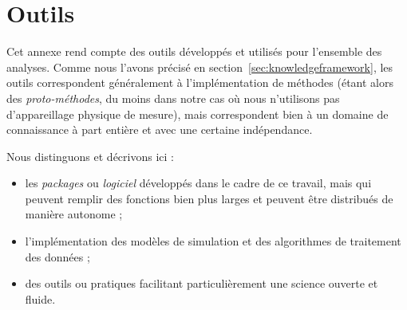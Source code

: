 
\chapter{Outils}




\label{app:tools} %




Cet annexe rend compte des outils développés et utilisés pour l'ensemble des analyses. Comme nous l'avons précisé en section~\ref{sec:knowledgeframework}, les outils correspondent généralement à l'implémentation de méthodes (étant alors des \emph{proto-méthodes}, du moins dans notre cas où nous n'utilisons pas d'appareillage physique de mesure), mais correspondent bien à un domaine de connaissance à part entière et avec une certaine indépendance.


Nous distinguons et décrivons ici :
\begin{itemize}
	\item les \emph{packages} ou \emph{logiciel} développés dans le cadre de ce travail, mais qui peuvent remplir des fonctions bien plus larges et peuvent être distribués de manière autonome ;
	\item l'implémentation des modèles de simulation et des algorithmes de traitement des données ;
	\item des outils ou pratiques facilitant particulièrement une science ouverte et fluide.
\end{itemize}






\stars